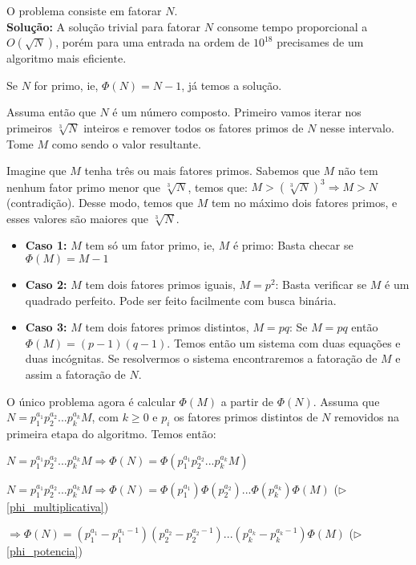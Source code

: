 O problema consiste em fatorar $N$. 
\\

\textbf{Solução:}
A solução trivial para fatorar $N$ consome tempo proporcional a $O(\sqrt{N})$, porém para uma entrada na ordem de $10^{18}$ precisames de um algoritmo mais eficiente.

Se $N$ for primo, ie, $\Phi(N) = N-1$, já temos a solução.

Assuma então que $N$ é um número composto. Primeiro vamos iterar nos primeiros $\sqrt[3]{N}$ inteiros e remover todos os fatores primos de $N$ nesse intervalo. Tome $M$ como sendo o valor resultante.

Imagine que $M$ tenha três ou mais fatores primos. Sabemos que $M$ não tem nenhum fator primo menor que $\sqrt[3]{N}$, temos que: $M > (\sqrt[3]{N})^3 \Rightarrow M > N$ (contradição).
Desse modo, temos que $M$ tem no máximo dois fatores primos, e esses valores são maiores que $\sqrt[3]{N}$.

\begin{itemize}
  \item \textbf{Caso 1:} $M$ tem só um fator primo, ie, $M$ é primo:
		Basta checar se $\Phi(M) = M-1$

  \item \textbf{Caso 2:} $M$ tem dois fatores primos iguais, $M = p ^2$:
		Basta verificar se $M$ é um quadrado perfeito. Pode ser feito facilmente com busca binária.

  \item \textbf{Caso 3:} $M$ tem dois fatores primos distintos, $M = pq$:
		Se $M=pq$ então $\Phi(M) = (p-1)(q-1)$. Temos então um sistema com duas equações e duas incógnitas. Se resolvermos o sistema encontraremos a fatoração de $M$ e assim a fatoração de $N$.
\end{itemize}
O único problema agora é calcular $\Phi(M)$ a partir de $\Phi(N)$. Assuma que $N = p_1^{a_1}p_2^{a_2}...p_k^{a_k}M$, com $k \geq 0$ e 
 $p_i$ os fatores primos distintos de $N$ removidos na primeira etapa do algoritmo. Temos então:

$N = p_1^{a_1}p_2^{a_2}...p_k^{a_k}M \Rightarrow \Phi(N) = \Phi(p_1^{a_1}p_2^{a_2}...p_k^{a_k}M)$

$N = p_1^{a_1}p_2^{a_2}...p_k^{a_k}M \Rightarrow \Phi(N) = \Phi(p_1^{a_1})\Phi(p_2^{a_2})...\Phi(p_k^{a_k})\Phi(M)$ ($\triangleright$ \autoref{phi_multiplicativa})

$\Rightarrow \Phi(N) = (p_1^{a_1}-p_1^{a_1-1})(p_2^{a_2} - p_2^{a_2-1})...(p_k^{a_k}-p_k^{a_k-1})\Phi(M)$ ($\triangleright$ \autoref{phi_potencia})

